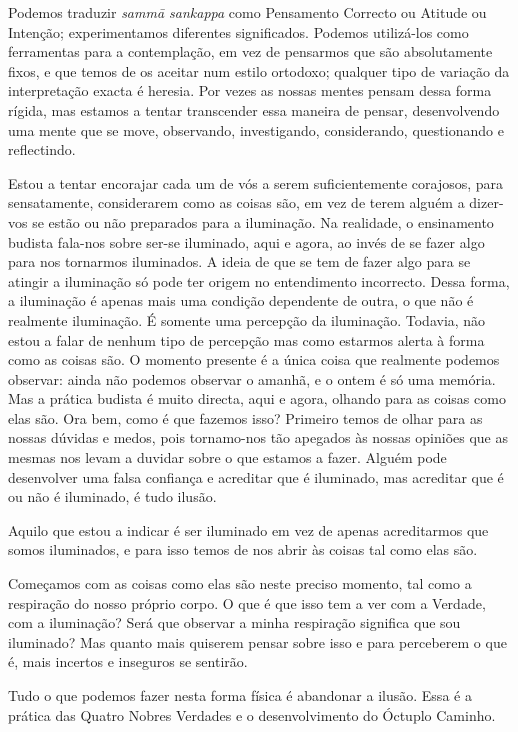 Podemos traduzir \emph{sammā sankappa} como Pensamento Correcto ou Atitude ou
Intenção; experimentamos diferentes significados. Podemos utilizá-los como
ferramentas para a contemplação, em vez de pensarmos que são absolutamente
fixos, e que temos de os aceitar num estilo ortodoxo; qualquer tipo de variação
da interpretação exacta é heresia. Por vezes as nossas mentes pensam dessa forma
rígida, mas estamos a tentar transcender essa maneira de pensar, desenvolvendo
uma mente que se move, observando, investigando, considerando, questionando e
reflectindo.

Estou a tentar encorajar cada um de vós a serem suficientemente corajosos, para
sensatamente, considerarem como as coisas são, em vez de terem alguém a
dizer-vos se estão ou não preparados para a iluminação. Na realidade, o
ensinamento budista fala-nos sobre ser-se iluminado, aqui e agora, ao invés de
se fazer algo para nos tornarmos iluminados. A ideia de que se tem de fazer algo
para se atingir a iluminação só pode ter origem no entendimento incorrecto.
Dessa forma, a iluminação é apenas mais uma condição dependente de outra, o que
não é realmente iluminação. É somente uma percepção da iluminação. Todavia, não
estou a falar de nenhum tipo de percepção mas como estarmos alerta à forma como
as coisas são. O momento presente é a única coisa que realmente podemos
observar: ainda não podemos observar o amanhã, e o ontem é só uma memória. Mas a
prática budista é muito directa, aqui e agora, olhando para as coisas como elas
são. Ora bem, como é que fazemos isso? Primeiro temos de olhar para as nossas
dúvidas e medos, pois tornamo-nos tão apegados às nossas opiniões que as mesmas
nos levam a duvidar sobre o que estamos a fazer. Alguém pode desenvolver uma
falsa confiança e acreditar que é iluminado, mas acreditar que é ou não é
iluminado, é tudo ilusão.

Aquilo que estou a indicar é ser iluminado em vez de apenas acreditarmos que
somos iluminados, e para isso temos de nos abrir às coisas tal como elas são.

Começamos com as coisas como elas são neste preciso momento, tal como a
respiração do nosso próprio corpo. O que é que isso tem a ver com a Verdade, com
a iluminação? Será que observar a minha respiração significa que sou iluminado?
Mas quanto mais quiserem pensar sobre isso e para perceberem o que é, mais
incertos e inseguros se sentirão.

Tudo o que podemos fazer nesta forma física é abandonar a ilusão. Essa é a
prática das Quatro Nobres Verdades e o desenvolvimento do Óctuplo Caminho.

